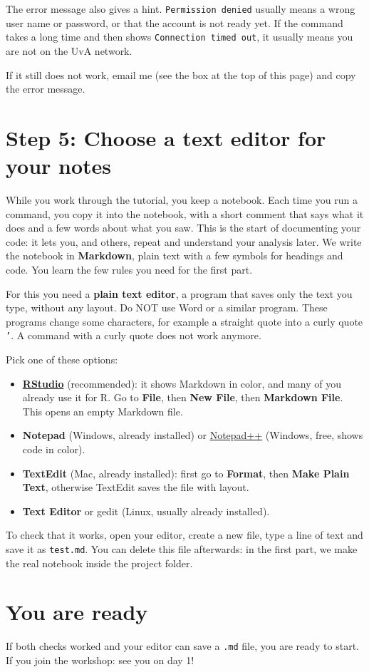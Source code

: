 \documentclass[
  letterpaper,
  DIV=11,
  numbers=noendperiod]{scrreprt}
\providecommand{\tightlist}{%
  \setlength{\itemsep}{0pt}\setlength{\parskip}{0pt}}
\begin{document}
The error message also gives a hint. \texttt{Permission\ denied} usually
means a wrong user name or password, or that the account is not ready
yet. If the command takes a long time and then shows
\texttt{Connection\ timed\ out}, it usually means you are not on the UvA
network.

If it still does not work, email me (see the box at the top of this
page) and copy the error message.

\section{Step 5: Choose a text editor for your
notes}\label{step-5-choose-a-text-editor-for-your-notes}

While you work through the tutorial, you keep a notebook. Each time you
run a command, you copy it into the notebook, with a short comment that
says what it does and a few words about what you saw. This is the start
of documenting your code: it lets you, and others, repeat and understand
your analysis later. We write the notebook in \textbf{Markdown}, plain
text with a few symbols for headings and code. You learn the few rules
you need for the first part.

For this you need a \textbf{plain text editor}, a program that saves
only the text you type, without any layout. Do NOT use Word or a similar
program. These programs change some characters, for example a straight
quote \texttt{\textquotesingle{}} into a curly quote \texttt{’}. A
command with a curly quote does not work anymore.

Pick one of these options:

\begin{itemize}
\tightlist
\item
  \href{https://posit.co/downloads}{\textbf{RStudio}} (recommended): it
  shows Markdown in color, and many of you already use it for R. Go to
  \textbf{File}, then \textbf{New File}, then \textbf{Markdown File}.
  This opens an empty Markdown file.
\item
  \textbf{Notepad} (Windows, already installed) or
  \href{https://notepad-plus-plus.org/}{Notepad++} (Windows, free, shows
  code in color).
\item
  \textbf{TextEdit} (Mac, already installed): first go to
  \textbf{Format}, then \textbf{Make Plain Text}, otherwise TextEdit
  saves the file with layout.
\item
  \textbf{Text Editor} or gedit (Linux, usually already installed).
\end{itemize}

To check that it works, open your editor, create a new file, type a line
of text and save it as \texttt{test.md}. You can delete this file
afterwards: in the first part, we make the real notebook inside the
project folder.

\section{You are ready}\label{you-are-ready}

If both checks worked and your editor can save a \texttt{.md} file, you
are ready to start. If you join the workshop: see you on day 1!
\end{document}
